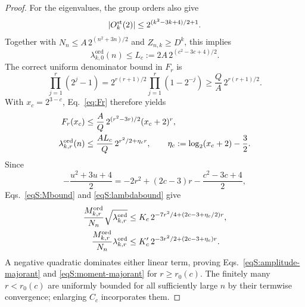\documentclass[journal,twocolumn]{IEEEtran}
\theoremstyle{definition}
\theoremstyle{plain}
\newcommand{\Ord}{\mathrm{ord}}
\begin{document}
\begin{proof}
For the eigenvalues, the group orders also give
\begin{equation}
 |O_k^{\rm st}(2)|\leq2^{(k^2-3k+4)/2+1}.
\end{equation}
Together with
$N_n\leq A\,2^{(n^2+3n)/2}$ and $Z_{n,k}\geq D^k$, this implies
\begin{equation}
 \lambda^{\Ord}_{k,0}(n)
 \leq L_c:=2A\,2^{(c^2-3c+4)/2}.
 \label{eqS:lambda0-uniform}
\end{equation}
The correct uniform denominator bound in $F_r$ is
\begin{equation}
 \prod_{j=1}^{r}(2^j-1)
 =2^{r(r+1)/2}\prod_{j=1}^{r}(1-2^{-j})
 \geq\frac QA\,2^{r(r+1)/2}.
 \label{eqS:Fbounds}
\end{equation}
With $x_c=2^{3-c}$, Eq.~\eqref{eq:Fr} therefore yields
\begin{align}
 F_r(x_c)
 &\leq\frac AQ\,2^{(r^2-3r)/2}(x_c+2)^r,\notag\\
 \lambda^{\Ord}_{k,r}(n)
 &\leq\frac{AL_c}{Q}\,2^{r^2/2+\eta_cr},
 \qquad
 \eta_c:=\log_2(x_c+2)-\frac32.
 \label{eqS:lambdabound}
\end{align}
Since
\begin{equation}
 -\frac{u^2+3u+4}{2}
 =-2r^2+(2c-3)r-\frac{c^2-3c+4}{2},
\end{equation}
Eqs.~\eqref{eqS:Mbound} and \eqref{eqS:lambdabound} give
\begin{align}
 \frac{M^{\Ord}_{k,r}}{N_n}\sqrt{\lambda^{\Ord}_{k,r}}
 &\leq K_c\,2^{-7r^2/4+(2c-3+\eta_c/2)r},\notag\\
 \frac{M^{\Ord}_{k,r}}{N_n}\lambda^{\Ord}_{k,r}
 &\leq K'_c\,2^{-3r^2/2+(2c-3+\eta_c)r}.
\end{align}
A negative quadratic dominates either linear term, proving
Eqs.~\eqref{eqS:amplitude-majorant} and
\eqref{eqS:moment-majorant} for $r\geq r_0(c)$.  The finitely many
$r<r_0(c)$ are uniformly bounded for all sufficiently large $n$ by their
termwise convergence; enlarging $C_c$ incorporates them.


\end{proof}
\end{document}
